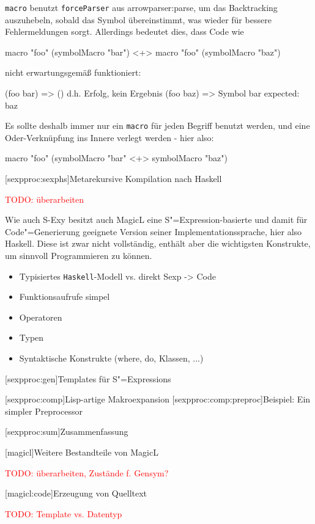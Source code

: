\documentclass[11pt, a4paper, bibgerm]{book}
\newcommand\icode[1]{\lstinline?#1?}
\newcommand{\todo}[1]{
  \textcolor{red}{TODO: #1}
}
\newcommand\lchapter{}
\newcommand\lsection{}
\newcommand\lsubsection{}
\newcommand\sref{}
\newcommand{\sexy}{S-Exy}
\newcommand{\sexp}{S"=Expression}
\newcommand{\sexps}{S"=Expressions}
\newcommand{\cgen}{Code"=Generierung}
\begin{document}
\icode{macro} benutzt \icode{forceParser} aus
\sref{arrowparser:parse}, um das Backtracking auszuhebeln, sobald das
Symbol übereinstimmt, was wieder für bessere Fehlermeldungen
sorgt. Allerdings bedeutet dies, dass Code wie
\begin{code}
macro "foo" (symbolMacro "bar") <+> macro "foo" (symbolMacro "baz")
\end{code}
nicht erwartungsgemäß funktioniert:
\begin{code}
(foo bar)   => ()  d.h. Erfolg, kein Ergebnis
(foo baz)   => Symbol bar expected: baz
\end{code}
Es sollte deshalb immer nur ein \icode{macro} für jeden Begriff benutzt
werden, und eine Oder-Verknüpfung ins Innere verlegt werden - hier also:
\begin{code}
macro "foo" (symbolMacro "bar" <+> symbolMacro "baz")
\end{code}

\lsection[sexpproc:sexphs]{Metarekursive Kompilation nach Haskell}

\todo{überarbeiten}

Wie auch \sexy{} besitzt auch MagicL eine \sexp{}-basierte und damit für
\cgen{} geeignete Version seiner Implementationssprache, hier
also Haskell. Diese ist zwar nicht vollständig, enthält aber die
wichtigsten Konstrukte, um sinnvoll Programmieren zu können.

\begin{itemize}
\item Typisiertes \icode{Haskell}-Modell vs. direkt Sexp -> Code
\item Funktionsaufrufe simpel
\item Operatoren
\item Typen
\item Syntaktische Konstrukte (where, do, Klassen, ...)
\end{itemize}

\lsection[sexpproc:gen]{Templates für \sexps}

\lsection[sexpproc:comp]{Lisp-artige Makroexpansion}
\lsubsection[sexpproc:comp:preproc]{Beispiel: Ein simpler Preprocessor}

\lsection[sexpproc:sum]{Zusammenfassung}

\lchapter[magicl]{Weitere Bestandteile von MagicL}

\todo{überarbeiten, Zustände f. Gensym?}

\lsection[magicl:code]{Erzeugung von Quelltext}

\todo{Template vs. Datentyp}
\end{document}
